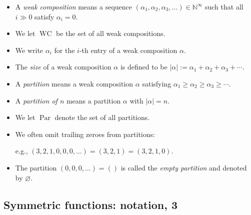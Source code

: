 \documentclass[numbers=enddot,12pt,final,onecolumn,notitlepage]{scrartcl}%
\newcommand{\defn}[1]{{\color{darkred}\emph{#1}}}
\newcommand{\0}{\phantom{c}}
\begin{document}
\begin{itemize}
\item A \defn{weak composition} means a sequence $\left(  \alpha_{1}%
,\alpha_{2},\alpha_{3},\ldots\right)  \in\mathbb{N}^{\infty}$ such that all
$i\gg0$ satisfy $\alpha_{i}=0$.

\item We let \defn{$\operatorname*{WC}$} be the set of all weak compositions.

\item We write \defn{$\alpha_{i}$} for the $i$-th entry of a weak composition
$\alpha$.

\item The \defn{size} of a weak composition $\alpha$ is defined to be
$\left\vert \alpha\right\vert :=\alpha_{1}+\alpha_{2}+\alpha_{3}+\cdots$.

\item A \defn{partition} means a weak composition $\alpha$ satisfying
$\alpha_{1}\geq\alpha_{2}\geq\alpha_{3}\geq\cdots$.

\item A \defn{partition of $n$} means a partition $\alpha$ with $\left\vert
\alpha\right\vert =n$.

\item We let \defn{$\operatorname*{Par}$} denote the set of all partitions.


\item We often omit trailing zeroes from partitions:

e.g., $\left(  3,2,1,0,0,0,\ldots\right)  =\left(  3,2,1\right)  =\left(
3,2,1,0\right)  $.

\item The partition $\left(  0,0,0,\ldots\right)  =\left(  {}\right)  $ is
called the \defn{empty partition} and denoted by \defn{$\varnothing$}.
\end{itemize}

\subsection{Symmetric functions: notation, 3}
\end{document}

